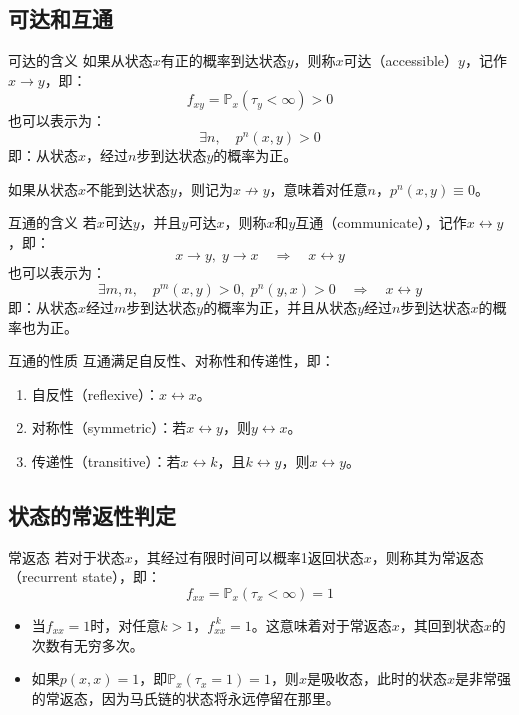 \documentclass[t]{beamer}
\renewcommand{\Pr}{\mathbb{P}}
\begin{document}
\subsection{可达和互通}
\begin{frame}{可达的含义}
    如果从状态$x$有正的概率到达状态$y$，则称$x$可达（accessible）$y$，记作$x\to y$，即：
	\[f_{xy}=\Pr_x(\tau_y<\infty)>0 \]
也可以表示为：
\[\exists n,\quad p^n(x,y)>0\]
即：从状态$x$，经过$n$步到达状态$y$的概率为正。


如果从状态$x$不能到达状态$y$，则记为$x\not\to y$，意味着对任意$n$，$p^n(x,y)\equiv 0$。

\end{frame}


\begin{frame}{互通的含义}
    若$x$可达$y$，并且$y$可达$x$，则称$x$和$y$互通（communicate），记作$x\leftrightarrow y$，即：
	\[x\to y,\; y\to x\quad\Rightarrow\quad  x\leftrightarrow y\]
也可以表示为：
\[\exists m,n,\quad p^m(x,y)>0,\;p^n(y,x)>0 \quad\Rightarrow\quad  x\leftrightarrow y\]
即：从状态$x$经过$m$步到达状态$y$的概率为正，并且从状态$y$经过$n$步到达状态$x$的概率也为正。
\end{frame}


\begin{frame}{互通的性质}
    互通满足自反性、对称性和传递性，即：
    \begin{enumerate}
    \item 自反性（reflexive）：$x\leftrightarrow x$。
    \item 对称性（symmetric）：若$x\leftrightarrow y$，则$y\leftrightarrow x$。
    \item 传递性（transitive）：若$x\leftrightarrow k$，且$k\leftrightarrow y$，则$x\leftrightarrow y$。
    \end{enumerate}
\end{frame}

\subsection{状态的常返性判定}
\begin{frame}{常返态}
    若对于状态$x$，其经过有限时间可以概率1返回状态$x$，则称其为常返态（recurrent state），即：
    \[f_{xx}=\Pr_x(\tau_x<\infty)=1 \]
\begin{itemize}
    \item 当$f_{xx}=1$时，对任意$k>1$，$f_{xx}^{\, k}=1$。这意味着对于常返态$x$，其回到状态$x$的次数有无穷多次。
    \item 如果$p(x,x)=1$，即$\Pr_x(\tau_x=1)=1$，则$x$是吸收态，此时的状态$x$是非常强的常返态，因为马氏链的状态将永远停留在那里。
\end{itemize}
    \end{frame}
\end{document}
